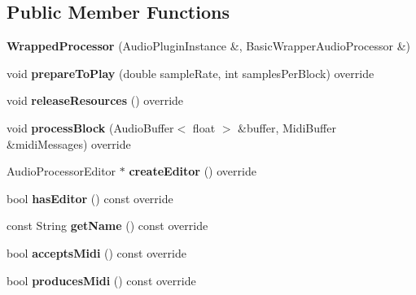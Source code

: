 \subsection*{Public Member Functions}
\begin{DoxyCompactItemize}
\item 
\mbox{\label{class_wrapped_processor_ac8457b0e4a82db249d1e74badfe3bef7}} 
{\bfseries Wrapped\+Processor} (Audio\+Plugin\+Instance \&, Basic\+Wrapper\+Audio\+Processor \&)
\item 
\mbox{\label{class_wrapped_processor_acc45968faccac42a4780d0661be7a531}} 
void {\bfseries prepare\+To\+Play} (double sample\+Rate, int samples\+Per\+Block) override
\item 
\mbox{\label{class_wrapped_processor_aff68c9eae9c718e95dc3963ac89eb1b2}} 
void {\bfseries release\+Resources} () override
\item 
\mbox{\label{class_wrapped_processor_a94ac5c874a70f234880e162041d91521}} 
void {\bfseries process\+Block} (Audio\+Buffer$<$ float $>$ \&buffer, Midi\+Buffer \&midi\+Messages) override
\item 
\mbox{\label{class_wrapped_processor_a5da71fec0a084134d5c33d5aebc2222a}} 
Audio\+Processor\+Editor $\ast$ {\bfseries create\+Editor} () override
\item 
\mbox{\label{class_wrapped_processor_a3b3491ccd414fefe541fb9ea578aeb15}} 
bool {\bfseries has\+Editor} () const override
\item 
\mbox{\label{class_wrapped_processor_ac1f6b81543d073b4c9a7576279d48874}} 
const String {\bfseries get\+Name} () const override
\item 
\mbox{\label{class_wrapped_processor_a8b14113d9c911f443e4ab447339fd0b3}} 
bool {\bfseries accepts\+Midi} () const override
\item 
\mbox{\label{class_wrapped_processor_a14110afef56aeb867adbaa33ea5358c3}} 
bool {\bfseries produces\+Midi} () const override

\end{DoxyCompactItemize}
